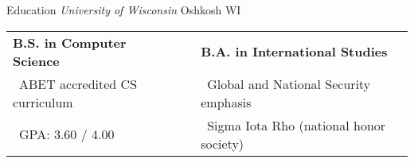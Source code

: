\cventry
    {Education}
    {\textnormal{\textit{University of Wisconsin}}}
    {}
    {Oshkosh}
    {WI}
    {
    \begin{tabular}{lcl}
        \textbf{B.S. in Computer Science} & \hspace{3em} & \textbf{B.A. in International Studies}\\
        \ ABET accredited CS curriculum & & \ Global and National Security
        emphasis\\
        \ GPA: 3.60 / 4.00 & & \ Sigma Iota Rho (national honor society)
    \end{tabular}}
